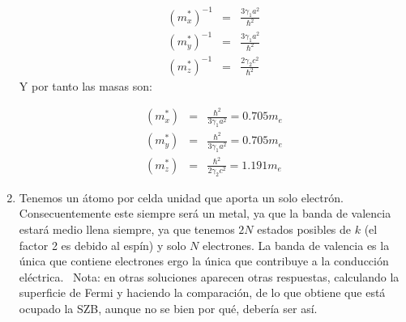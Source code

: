 \begin{solucion}
\begin{enumerate}[label=\alph*)]
		 \begin{eqnarray*}
		 	(m_{x}^*)^{-1} & = &  \frac{3\gamma_1 a^2}{\hbar^2}	 	\\
		 	(m_{y}^*)^{-1} & =  & \frac{3\gamma_1 a^2}{\hbar^2}   \\
		 	(m_{z}^*)^{-1} & = & \frac{2 \gamma_2 c^2}{\hbar^2}
		 \end{eqnarray*}	
		 Y por tanto las masas son: 
		 
		 \begin{eqnarray*}
		 	(m_{x}^*) & = & \frac{\hbar^2}{3\gamma_1 a^2}= 0.705 m_e	 	\\
		 	(m_{y}^*) & = & \frac{\hbar^2}{3\gamma_1 a^2}=0.705 m_e	  \\
		 	(m_{z}^*) & = & \frac{\hbar^2}{2 \gamma_2 c^2} = 1.191 m_e	 
		 \end{eqnarray*}	
		 \item Tenemos un átomo por celda unidad que aporta un solo electrón. Consecuentemente este siempre será un metal, ya que la banda de valencia estará medio llena siempre, ya que tenemos $2N$ estados posibles de $k$ (el factor 2 es debido al espín) y solo $N$ electrones. La banda de valencia es la única que contiene electrones ergo la única que contribuye a la conducción eléctrica.\ \textcolor{verdehojaoscuro}{ Nota: en otras soluciones aparecen otras respuestas, calculando la superficie de Fermi y haciendo la comparación, de lo que obtiene que está ocupado la SZB, aunque no se bien por qué, debería ser así.}
		 
		 
	\end{enumerate}
\end{solucion}

